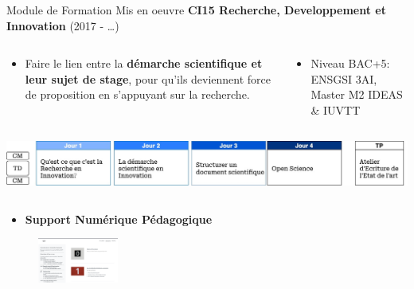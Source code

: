 \documentclass[
  11pt,
  ignorenonframetext,
  aspectratio=169,
  c]{beamer}
\providecommand{\tightlist}{%
  \setlength{\itemsep}{0pt}\setlength{\parskip}{0pt}}\usepackage{longtable,booktabs,array}
\begin{document}
\begin{frame}[t]{Module de Formation Mis en oeuvre}
\protect\hypertarget{module-de-formation-mis-en-oeuvre}{}
\textbf{CI15 Recherche, Developpement et Innovation} \hfill (2017 -
\ldots)

\begin{columns}[T]
\begin{column}[c]{0.5\textwidth}
\scriptsize

\begin{itemize}
\tightlist
\item
  Faire le lien entre la \textbf{démarche scientifique et leur sujet de
  stage}, pour qu'ils deviennent force de proposition en s'appuyant sur
  la recherche.
\end{itemize}
\end{column}

\begin{column}[c]{0.5\textwidth}
\scriptsize

\begin{itemize}
\tightlist
\item
  Niveau BAC+5: ENSGSI 3AI, Master M2 IDEAS \& IUVTT
\end{itemize}
\end{column}
\end{columns}

\includegraphics{figures/slides/Ensegnement-CI15.jpg}

\begin{columns}[T]
\begin{column}[T]{0.5\textwidth}
\footnotesize

\begin{itemize}
\tightlist
\item
  \textbf{Support Numérique Pédagogique}
\end{itemize}

\begin{figure}

{\centering \includegraphics[width=1.04167in,height=\textheight]{figures/slides/CI15-web.png}

}

\end{figure}


\end{column}
\end{columns}
\end{frame}
\end{document}
